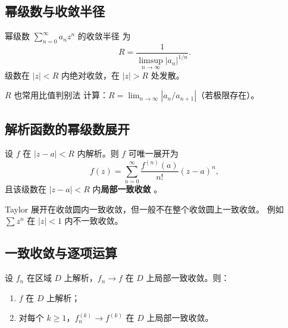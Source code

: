 
\subsection{幂级数与收敛半径}

\begin{theorem}
幂级数 $\sum_{n=0}^{\infty} a_n z^n$ 的收敛半径  为
\[
  R = \frac{1}{\limsup_{n\to\infty} |a_n|^{1/n}}.
\]
级数在 $|z| < R$ 内绝对收敛，在 $|z| > R$ 处发散。
\end{theorem}

\begin{remark}
$R$ 也常用比值判别法  计算：$R = \lim_{n\to\infty} |a_n/a_{n+1}|$（若极限存在）。
\end{remark}

\subsection{解析函数的幂级数展开}

\begin{theorem}
设 $f$ 在 $|z - a| < R$ 内解析。则 $f$ 可唯一展开为
\[
  f(z) = \sum_{n=0}^{\infty} \frac{f^{(n)}(a)}{n!}(z-a)^n,
\]
且该级数在 $|z-a| < R$ 内\textbf{局部一致收敛} 。
\end{theorem}

\begin{remark}
Taylor 展开在收敛圆内一致收敛，但一般不在整个收敛圆上一致收敛。
例如 $\sum z^n$ 在 $|z| < 1$ 内不一致收敛。
\end{remark}

\subsection{一致收敛与逐项运算}

\begin{theorem}
设 $f_n$ 在区域 $D$ 上解析，$f_n \to f$ 在 $D$ 上局部一致收敛。则：
\begin{enumerate}  \item $f$ 在 $D$ 上解析；
  \item 对每个 $k \geq 1$，$f_n^{(k)} \to f^{(k)}$ 在 $D$ 上局部一致收敛。
\end{enumerate}
\end{theorem}

